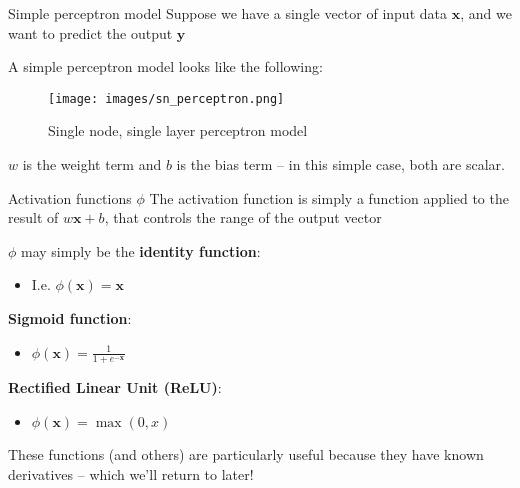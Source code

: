 \documentclass[
  ignorenonframetext,
]{beamer}
\providecommand{\tightlist}{%
  \setlength{\itemsep}{0pt}\setlength{\parskip}{0pt}}
\begin{document}
\begin{frame}{Simple perceptron model}
\protect\hypertarget{simple-perceptron-model}{}
Suppose we have a single vector of input data \(\bm{x}\), and we want to
predict the output \(\bm{y}\)

A simple perceptron model looks like the following:

\begin{figure}
\centering
\texttt{[image: images/sn\_perceptron.png]}
\caption{Single node, single layer perceptron model}
\end{figure}

\(w\) is the weight term and \(b\) is the bias term -- in this simple
case, both are scalar.
\end{frame}

\begin{frame}{Activation functions \(\phi\)}
\protect\hypertarget{activation-functions-phi}{}
The activation function is simply a function applied to the result of
\(w\bm{x} + b\), that controls the range of the output vector

\(\phi\) may simply be the \textbf{identity function}:

\begin{itemize}
\tightlist
\item
  I.e. \(\phi(\bm{x}) = \bm{x}\)
\end{itemize}

\textbf{Sigmoid function}:

\begin{itemize}
\tightlist
\item
  \(\phi(\bm{x}) = \frac{1}{1 + e^{-\bm{x}}}\)
\end{itemize}

\textbf{Rectified Linear Unit (ReLU)}:

\begin{itemize}
\tightlist
\item
  \(\phi(\bm{x}) = \max(0,x)\)
\end{itemize}

These functions (and others) are particularly useful because they have
known derivatives -- which we'll return to later!
\end{frame}
\end{document}
